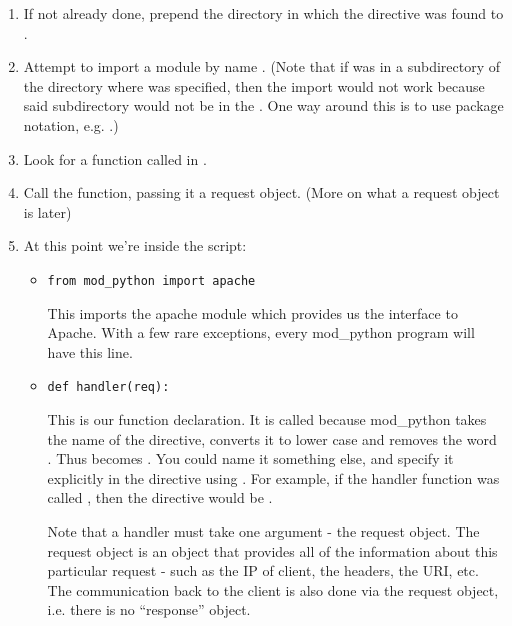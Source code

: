 \begin{enumerate}

\item
  If not already done, prepend the directory in which the
   directive was found to .

\item
  Attempt to import a module by name . (Note that if
   was in a subdirectory of the directory where
   was specified, then the import would not work
  because said subdirectory would not be in the . One
  way around this is to use package notation, e.g. .)

\item 
  Look for a function called  in .

\item
  Call the function, passing it a request object. (More on what a
  request object is later)

\item
  At this point we're inside the script: 

  \begin{itemize}

  \item
    \begin{verbatim}
from mod_python import apache
    \end{verbatim}

    This imports the apache module which provides us the interface to
    Apache. With a few rare exceptions, every mod_python program will have
    this line.

  \item
    \begin{verbatim}
def handler(req):
    \end{verbatim}

     This is our  function declaration. It
    is called  because mod_python takes the name of the
    directive, converts it to lower case and removes the word
    . Thus  becomes
    . You could name it something else, and specify it
    explicitly in the directive using \samp{::}. For example, if the
    handler function was called , then the directive would
    be .

    Note that a handler must take one argument - the request
    object. The request object is an object that provides all of the
    information about this particular request - such as the IP of
    client, the headers, the URI, etc. The communication back to the
    client is also done via the request object, i.e. there is no
    ``response'' object.


\end{itemize}
\end{enumerate}
